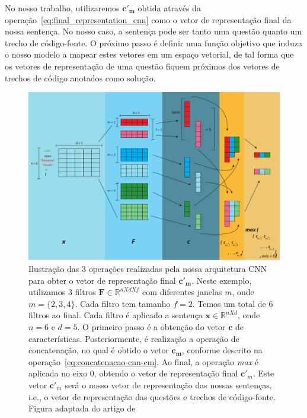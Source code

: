 No nosso trabalho, utilizaremos $\bm{c'}_{\bm{m}}$ obtida através da operação~\ref{eq:final_representation_cnn} como o vetor de representação final da nossa sentença. No nosso caso, a sentença pode ser tanto uma questão quanto um trecho de código-fonte. O próximo passo é definir uma função objetivo que induza o nosso modelo a mapear estes vetores em um espaço vetorial, de tal forma que os vetores de representação de uma questão fiquem próximos dos vetores de trechos de código anotados como solução.

\begin{figure}[h]
    \centering
    \includegraphics[width=1\textwidth]{figuras/cap-problema/cnn-architecture.pdf}
    \caption{Ilustração das 3 operações realizadas pela nossa arquitetura CNN para obter o vetor de representação final $\bm{c'}_{\bm{m}}$. Neste exemplo, utilizamos 3 filtros $\bm{F} \in \mathbb{R}^{n X d X f}$ com diferentes janelas $m$, onde $m = \{2, 3, 4\}$. Cada filtro tem tamanho $f = 2$. Temos um total de 6 filtros ao final. Cada filtro é aplicado a sentença $\bm{x} \in \mathbb{R}^{n X d}$, onde $n = 6$ e $d = 5$. O primeiro passo é a obtenção do vetor $\bm{c}$ de características. Posteriormente, é realização a operação de concatenação, no qual é obtido o vetor $\bm{c}_{\bm{m}}$, conforme descrito na operação~\ref{eq:concatenacao-cnn-cm}. Ao final, a operação \textit{max} é aplicada no eixo $0$, obtendo o vetor de representação final $\bm{c'}_{m}$. Este vetor $\bm{c'}_{m}$ será o nosso vetor de representação das nossas sentenças, i.e., o vetor de representação das questões e trechos de código-fonte. Figura adaptada do artigo de \cite{zhang-guide-convolutional-cnn-embedding-ilustration:2015}}
    \label{fig:cnn-architecture-proposal}
\end{figure}




